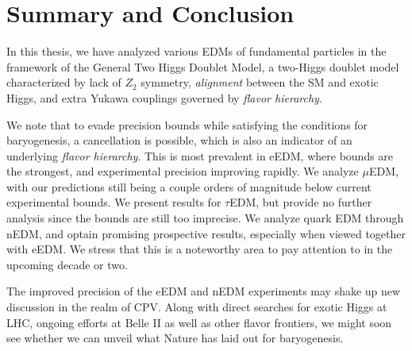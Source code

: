 \section{Summary and Conclusion}
In this thesis, we have analyzed various EDMs of fundamental particles in the framework of  the General Two Higgs Doublet Model,
a two-Higgs doublet model characterized by lack of \(Z_{2} \) symmetry, \textit{alignment} between the SM and exotic Higgs, and extra Yukawa couplings governed by \textit{flavor hierarchy}.

We note that to evade precision bounds while satisfying the conditions for baryogenesis, a cancellation is possible,
which is also an indicator of an underlying \textit{flavor hierarchy}.
This is most prevalent in eEDM, where bounds are the strongest, and experimental precision improving rapidly.
We analyze \(\mu \)EDM, with our predictions still being a couple orders of magnitude below current experimental bounds.
We present results for \(\tau \)EDM, but provide no further analysis since the bounds are still too imprecise.
We analyze quark EDM through nEDM, and optain promising prospective results, especially when viewed together with eEDM.
We stress that this is a noteworthy area to pay attention to in the upcoming decade or two.

The improved precision of the eEDM and nEDM experiments may shake up new discussion in the realm of CPV.
Along with direct searches for exotic Higgs at LHC, ongoing efforts at Belle II as well as other flavor frontiers,
we might soon see whether we can unveil what Nature has laid out for baryogenesis.